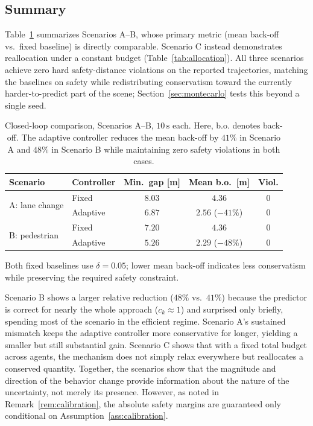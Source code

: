 \documentclass[letterpaper, 10 pt, conference]{ieeeconf}
\begin{document}
\subsection{Summary}

Table~\ref{tab:results} summarizes Scenarios A--B, whose primary metric (mean back-off vs.\ fixed baseline) is directly comparable. Scenario C instead demonstrates reallocation under a constant budget (Table~\ref{tab:allocation}). All three scenarios achieve zero hard safety-distance violations on the reported trajectories, matching the baselines on safety while redistributing conservatism toward the currently harder-to-predict part of the scene; Section~\ref{sec:montecarlo} tests this beyond a single seed.

\begin{table}[t]
\centering
\caption{Closed-loop comparison, Scenarios A--B, $10\,\mathrm s$ each. Here, b.o. denotes back-off. The adaptive controller reduces the mean back-off by $41\%$ in Scenario A and $48\%$ in Scenario B while maintaining zero safety violations in both cases.}
\label{tab:results}
\small
\setlength{\tabcolsep}{3.5pt}
\begin{tabular}{llccc}
\toprule
Scenario & Controller & Min.\ gap [m] & Mean b.o.\ [m] & Viol. \\
\midrule
\multirow{2}{*}{A: lane change} & Fixed & $8.03$ & $4.36$ & $0$ \\
 & Adaptive & $6.87$ & $2.56$ ($-41\%$) & $0$ \\
\midrule
\multirow{2}{*}{B: pedestrian} & Fixed & $7.20$ & $4.36$ & $0$ \\
 & Adaptive & $5.26$ & $2.29$ ($-48\%$) & $0$ \\
\bottomrule
\end{tabular}

\vspace{2pt}
\footnotesize Both fixed baselines use $\delta=0.05$; lower mean back-off indicates less conservatism while preserving the required safety constraint.
\end{table}

Scenario B shows a larger relative reduction ($48\%$ vs.\ $41\%$) because the predictor is correct for nearly the whole approach ($c_k\approx1$) and surprised only briefly, spending most of the scenario in the efficient regime. Scenario A's sustained mismatch keeps the adaptive controller more conservative for longer, yielding a smaller but still substantial gain. Scenario C shows that with a fixed total budget across agents, the mechanism does not simply relax everywhere but reallocates a conserved quantity. Together, the scenarios show that the magnitude and direction of the behavior change provide information about the nature of the uncertainty, not merely its presence. However, as noted in Remark~\ref{rem:calibration}, the absolute safety margins are guaranteed only conditional on Assumption~\ref{ass:calibration}.
\end{document}
